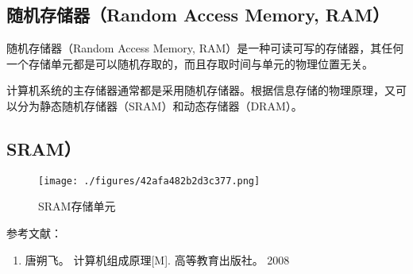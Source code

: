 
\begin{issues}
\issueDraft
\end{issues}

\subsection{随机存储器（Random Access Memory, RAM）}

随机存储器（Random Access Memory, RAM）是一种可读可写的存储器，其任何一个存储单元都是可以随机存取的，而且存取时间与单元的物理位置无关。

计算机系统的主存储器通常都是采用随机存储器。根据信息存储的物理原理，又可以分为静态随机存储器（SRAM）和动态存储器（DRAM）。


\subsection{SRAM）}

\begin{figure}[ht]
\centering
\texttt{[image: ./figures/42afa482b2d3c377.png]}
\caption{SRAM存储单元} \label{fig_RAM_1}
\end{figure}



参考文献：
\begin{enumerate}
\item 唐朔飞。 计算机组成原理[M]. 高等教育出版社。 2008
\end{enumerate}
